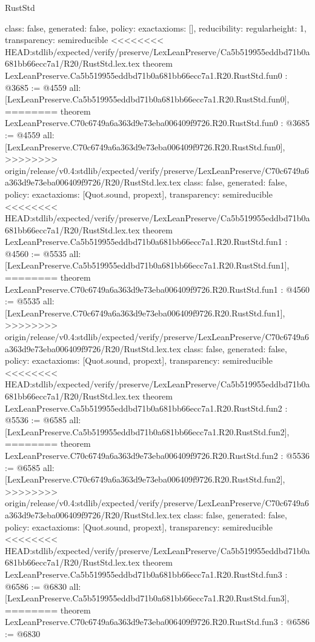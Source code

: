 \begin{lexlean}{RustStd}
\begin{coremodule}
{\begin{coremodule}
{{{  class: false,
  generated: false,
  policy: exact{axioms: []},
  reducibility: regular{height: 1},
  transparency: semireducible
}
<<<<<<<< HEAD:stdlib/expected/verify/preserve/LexLeanPreserve/Ca5b519955eddbd71b0a681bb66ecc7a1/R20/RustStd.lex.tex
theorem LexLeanPreserve.Ca5b519955eddbd71b0a681bb66ecc7a1.R20.RustStd.fun0 : @3685 := @4559 {
  all: [LexLeanPreserve.Ca5b519955eddbd71b0a681bb66ecc7a1.R20.RustStd.fun0],
========
theorem LexLeanPreserve.C70c6749a6a363d9e73eba006409f9726.R20.RustStd.fun0 : @3685 := @4559 {
  all: [LexLeanPreserve.C70c6749a6a363d9e73eba006409f9726.R20.RustStd.fun0],
>>>>>>>> origin/release/v0.4:stdlib/expected/verify/preserve/LexLeanPreserve/C70c6749a6a363d9e73eba006409f9726/R20/RustStd.lex.tex
  class: false,
  generated: false,
  policy: exact{axioms: [Quot.sound, propext]},
  transparency: semireducible
}
<<<<<<<< HEAD:stdlib/expected/verify/preserve/LexLeanPreserve/Ca5b519955eddbd71b0a681bb66ecc7a1/R20/RustStd.lex.tex
theorem LexLeanPreserve.Ca5b519955eddbd71b0a681bb66ecc7a1.R20.RustStd.fun1 : @4560 := @5535 {
  all: [LexLeanPreserve.Ca5b519955eddbd71b0a681bb66ecc7a1.R20.RustStd.fun1],
========
theorem LexLeanPreserve.C70c6749a6a363d9e73eba006409f9726.R20.RustStd.fun1 : @4560 := @5535 {
  all: [LexLeanPreserve.C70c6749a6a363d9e73eba006409f9726.R20.RustStd.fun1],
>>>>>>>> origin/release/v0.4:stdlib/expected/verify/preserve/LexLeanPreserve/C70c6749a6a363d9e73eba006409f9726/R20/RustStd.lex.tex
  class: false,
  generated: false,
  policy: exact{axioms: [Quot.sound, propext]},
  transparency: semireducible
}
<<<<<<<< HEAD:stdlib/expected/verify/preserve/LexLeanPreserve/Ca5b519955eddbd71b0a681bb66ecc7a1/R20/RustStd.lex.tex
theorem LexLeanPreserve.Ca5b519955eddbd71b0a681bb66ecc7a1.R20.RustStd.fun2 : @5536 := @6585 {
  all: [LexLeanPreserve.Ca5b519955eddbd71b0a681bb66ecc7a1.R20.RustStd.fun2],
========
theorem LexLeanPreserve.C70c6749a6a363d9e73eba006409f9726.R20.RustStd.fun2 : @5536 := @6585 {
  all: [LexLeanPreserve.C70c6749a6a363d9e73eba006409f9726.R20.RustStd.fun2],
>>>>>>>> origin/release/v0.4:stdlib/expected/verify/preserve/LexLeanPreserve/C70c6749a6a363d9e73eba006409f9726/R20/RustStd.lex.tex
  class: false,
  generated: false,
  policy: exact{axioms: [Quot.sound, propext]},
  transparency: semireducible
}
<<<<<<<< HEAD:stdlib/expected/verify/preserve/LexLeanPreserve/Ca5b519955eddbd71b0a681bb66ecc7a1/R20/RustStd.lex.tex
theorem LexLeanPreserve.Ca5b519955eddbd71b0a681bb66ecc7a1.R20.RustStd.fun3 : @6586 := @6830 {
  all: [LexLeanPreserve.Ca5b519955eddbd71b0a681bb66ecc7a1.R20.RustStd.fun3],
========
theorem LexLeanPreserve.C70c6749a6a363d9e73eba006409f9726.R20.RustStd.fun3 : @6586 := @6830 {
}}}}}}}
\end{coremodule}}
\end{coremodule}
\end{lexlean}
